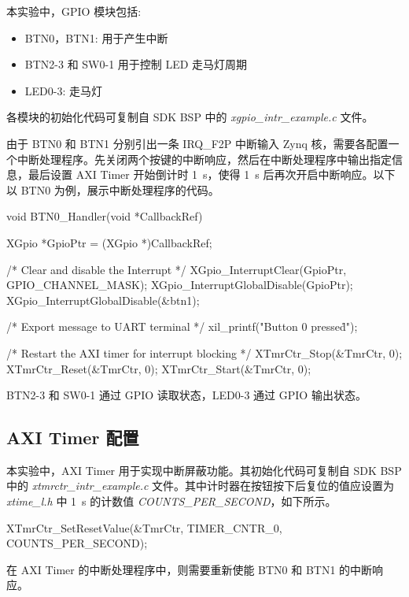 \documentclass{sjtureport}
\begin{document}
本实验中，GPIO 模块包括:

\begin{itemize}
	\item BTN0，BTN1: 用于产生中断
	\item BTN2-3 和 SW0-1 用于控制 LED 走马灯周期
	\item LED0-3: 走马灯
\end{itemize}

各模块的初始化代码可复制自 SDK BSP 中的 \textit{xgpio\_intr\_example.c} 文件。

由于 BTN0 和 BTN1 分别引出一条 IRQ\_F2P 中断输入 Zynq 核，需要各配置一个中断处理程序。先关闭两个按键的中断响应，然后在中断处理程序中输出指定信息，最后设置 AXI Timer 开始倒计时 \SI{1}{\s}，使得 \SI{1}{\s} 后再次开启中断响应。以下以 BTN0 为例，展示中断处理程序的代码。

\begin{codeblock}[language=C]
void BTN0_Handler(void *CallbackRef)
{
    XGpio *GpioPtr = (XGpio *)CallbackRef;

    /* Clear and disable the Interrupt */
    XGpio_InterruptClear(GpioPtr, GPIO_CHANNEL_MASK);
    XGpio_InterruptGlobalDisable(GpioPtr);
    XGpio_InterruptGlobalDisable(&btn1);

    /* Export message to UART terminal */
    xil_printf("Button 0 pressed\r\n");

    /* Restart the AXI timer for interrupt blocking */
    XTmrCtr_Stop(&TmrCtr, 0);
    XTmrCtr_Reset(&TmrCtr, 0);
    XTmrCtr_Start(&TmrCtr, 0);
}

\end{codeblock}

BTN2-3 和 SW0-1 通过 GPIO 读取状态，LED0-3 通过 GPIO 输出状态。

\subsection{AXI Timer 配置}

本实验中，AXI Timer 用于实现中断屏蔽功能。其初始化代码可复制自 SDK BSP 中的 \textit{xtmrctr\_intr\_example.c} 文件。其中计时器在按钮按下后复位的值应设置为 \textit{xtime\_l.h} 中 \SI{1}{\s} 的计数值 \textit{COUNTS\_PER\_SECOND}，如下所示。

\begin{codeblock}[language=C]
XTmrCtr_SetResetValue(&TmrCtr, TIMER_CNTR_0, COUNTS_PER_SECOND);
\end{codeblock}

在 AXI Timer 的中断处理程序中，则需要重新使能 BTN0 和 BTN1 的中断响应。
\end{document}
